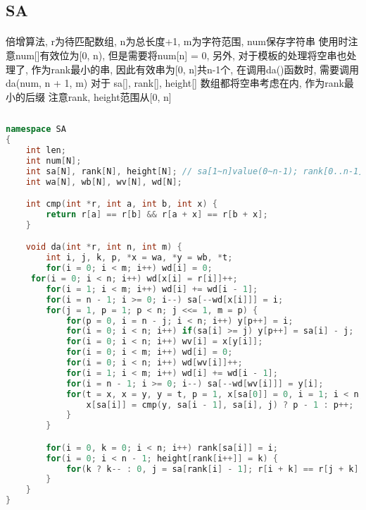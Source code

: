 ﻿\subsection{SA}
\paragraph{}
倍增算法, r为待匹配数组, n为总长度+1, m为字符范围, num保存字符串
使用时注意num[]有效位为[0, n), 但是需要将num[n] = 0, 另外, 对于模板的处理将空串也处理了, 作为rank最小的串, 因此有效串为[0, n]共n-1个, 在调用da()函数时, 需要调用da(num, n + 1, m) 对于 sa[], rank[], height[] 数组都将空串考虑在内, 作为rank最小的后缀
注意rank, height范围从[0, n]
\begin{lstlisting}[language=C++]
	
namespace SA
{
    int len;
    int num[N];
    int sa[N], rank[N], height[N]; // sa[1~n]value(0~n-1); rank[0..n-1]value(1..n); height[2..n]
    int wa[N], wb[N], wv[N], wd[N];

    int cmp(int *r, int a, int b, int x) {
        return r[a] == r[b] && r[a + x] == r[b + x];
    }

    void da(int *r, int n, int m) {
        int i, j, k, p, *x = wa, *y = wb, *t;
        for(i = 0; i < m; i++) wd[i] = 0;
     for(i = 0; i < n; i++) wd[x[i] = r[i]]++;
        for(i = 1; i < m; i++) wd[i] += wd[i - 1];
        for(i = n - 1; i >= 0; i--) sa[--wd[x[i]]] = i;
        for(j = 1, p = 1; p < n; j <<= 1, m = p) {
            for(p = 0, i = n - j; i < n; i++) y[p++] = i;
            for(i = 0; i < n; i++) if(sa[i] >= j) y[p++] = sa[i] - j;
            for(i = 0; i < n; i++) wv[i] = x[y[i]];
            for(i = 0; i < m; i++) wd[i] = 0;
            for(i = 0; i < n; i++) wd[wv[i]]++;
            for(i = 1; i < m; i++) wd[i] += wd[i - 1];
            for(i = n - 1; i >= 0; i--) sa[--wd[wv[i]]] = y[i];
            for(t = x, x = y, y = t, p = 1, x[sa[0]] = 0, i = 1; i < n; i++) {
                x[sa[i]] = cmp(y, sa[i - 1], sa[i], j) ? p - 1 : p++;
            }
        }

        for(i = 0, k = 0; i < n; i++) rank[sa[i]] = i;
        for(i = 0; i < n - 1; height[rank[i++]] = k) {
            for(k ? k-- : 0, j = sa[rank[i] - 1]; r[i + k] == r[j + k]; k++);
        }
    }
}
	\end{lstlisting}